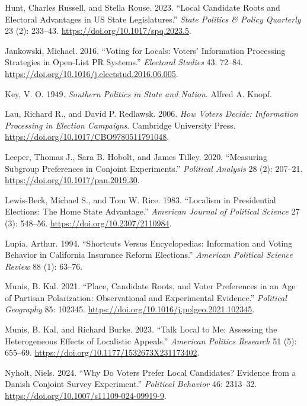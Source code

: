\documentclass[
  letterpaper,
  DIV=11,
  numbers=noendperiod]{scrartcl}
\newlength{\cslhangindent}
\newenvironment{CSLReferences}[2] %
 {\begin{list}{}{%
  \setlength{\itemindent}{0pt}
  \setlength{\leftmargin}{0pt}
  \setlength{\parsep}{0pt}
  \ifodd #1
   \setlength{\leftmargin}{\cslhangindent}
   \setlength{\itemindent}{-1\cslhangindent}
  \fi
  \setlength{\itemsep}{#2\baselineskip}}}
 {\end{list}}
\begin{document}
\begin{CSLReferences}{1}{1}
Hunt, Charles Russell, and Stella Rouse. 2023. {``Local Candidate Roots
and Electoral Advantages in {US} State Legislatures.''} \emph{State
Politics \& Policy Quarterly} 23 (2): 233--43.
\url{https://doi.org/10.1017/spq.2023.5}.

Jankowski, Michael. 2016. {``Voting for Locals: Voters' Information
Processing Strategies in Open-List {PR} Systems.''} \emph{Electoral
Studies} 43: 72--84.
\url{https://doi.org/10.1016/j.electstud.2016.06.005}.

Key, V. O. 1949. \emph{Southern Politics in State and Nation}. Alfred A.
Knopf.

Lau, Richard R., and David P. Redlawsk. 2006. \emph{How Voters Decide:
Information Processing in Election Campaigns}. Cambridge University
Press. \url{https://doi.org/10.1017/CBO9780511791048}.

Leeper, Thomas J., Sara B. Hobolt, and James Tilley. 2020. {``Measuring
Subgroup Preferences in Conjoint Experiments.''} \emph{Political
Analysis} 28 (2): 207--21. \url{https://doi.org/10.1017/pan.2019.30}.

Lewis-Beck, Michael S., and Tom W. Rice. 1983. {``Localism in
Presidential Elections: The Home State Advantage.''} \emph{American
Journal of Political Science} 27 (3): 548--56.
\url{https://doi.org/10.2307/2110984}.

Lupia, Arthur. 1994. {``Shortcuts Versus Encyclopedias: Information and
Voting Behavior in California Insurance Reform Elections.''}
\emph{American Political Science Review} 88 (1): 63--76.

Munis, B. Kal. 2021. {``Place, Candidate Roots, and Voter Preferences in
an Age of Partisan Polarization: Observational and Experimental
Evidence.''} \emph{Political Geography} 85: 102345.
\url{https://doi.org/10.1016/j.polgeo.2021.102345}.

Munis, B. Kal, and Richard Burke. 2023. {``Talk Local to Me: Assessing
the Heterogeneous Effects of Localistic Appeals.''} \emph{American
Politics Research} 51 (5): 655--69.
\url{https://doi.org/10.1177/1532673X231173402}.

Nyholt, Niels. 2024. {``Why Do Voters Prefer Local Candidates? Evidence
from a Danish Conjoint Survey Experiment.''} \emph{Political Behavior}
46: 2313--32. \url{https://doi.org/10.1007/s11109-024-09919-9}.


\end{CSLReferences}
\end{document}
